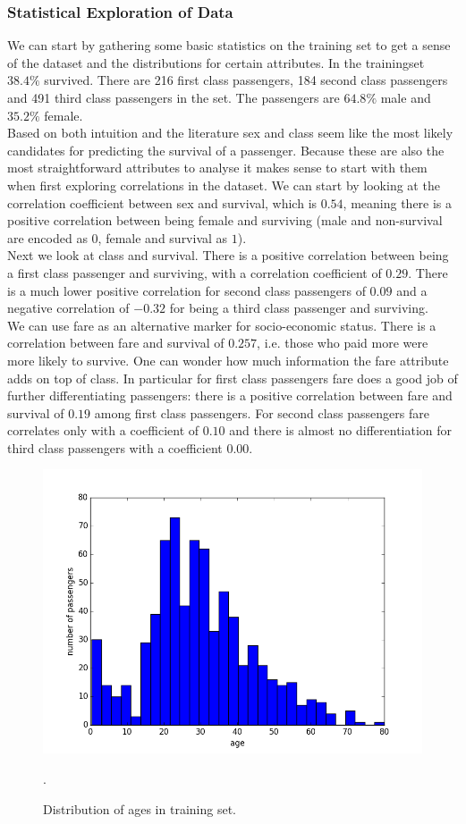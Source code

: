 \documentclass{llncs}
\begin{document}
\subsubsection{Statistical Exploration of Data}
We can start by gathering some basic statistics on the training set to get a sense of the dataset and the distributions for certain attributes. In the trainingset $38.4\%$ survived. There are 216 first class passengers, 184 second class passengers and 491 third class passengers in the set. The passengers are $64.8\%$ male and $35.2\%$ female.\\
Based on both intuition and the literature sex and class seem like the most likely candidates for predicting the survival of a passenger. Because these are also the most straightforward attributes to analyse it makes sense to start with them when first exploring correlations in the dataset. We can start by looking at the correlation coefficient between sex and survival, which is $0.54$, meaning there is a positive correlation between being female and surviving (male and non-survival are encoded as $0$, female and survival as $1$).\\
Next we look at class and survival. There is a positive correlation between being a first class passenger and surviving, with a correlation coefficient of $0.29$. There is a much lower positive correlation for second class passengers of $0.09$ and a negative correlation of $-0.32$ for being a third class passenger and surviving.\\
We can use fare as an alternative marker for socio-economic status. There is a correlation between fare and survival of $0.257$, i.e. those who paid more were more likely to survive. One can wonder how much information the fare attribute adds on top of class. In particular for first class passengers fare does a good job of further differentiating passengers: there is a positive correlation between fare and survival of $0.19$ among first class passengers. For second class passengers fare correlates only with a coefficient of $0.10$ and there is almost no differentiation for third class passengers with a coefficient $0.00$.
\begin{figure}[H]
    \includegraphics[width=0.7\linewidth]{age_distribution}
    \caption{Distribution of ages in training set.}
    \label{fig:age_histogram}.
\end{figure}
\end{document}
